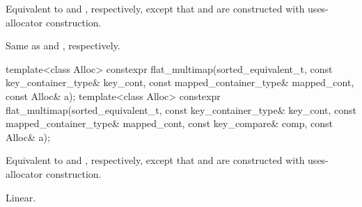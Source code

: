 \begin{itemdescr}
\pnum
\effects
Equivalent to  and
, respectively,
except that  and  are constructed
with uses-allocator construction.

\pnum
\complexity
Same as  and
, respectively.
\end{itemdescr}

%
\begin{itemdecl}
template<class Alloc>
  constexpr flat_multimap(sorted_equivalent_t, const key_container_type& key_cont,
                const mapped_container_type& mapped_cont, const Alloc& a);
template<class Alloc>
  constexpr flat_multimap(sorted_equivalent_t, const key_container_type& key_cont,
                const mapped_container_type& mapped_cont, const key_compare& comp,
                const Alloc& a);
\end{itemdecl}

\begin{itemdescr}
\pnum
\effects
Equivalent to  and
, respectively,
except that  and  are constructed
with uses-allocator construction.

\pnum
\complexity
Linear.
\end{itemdescr}

